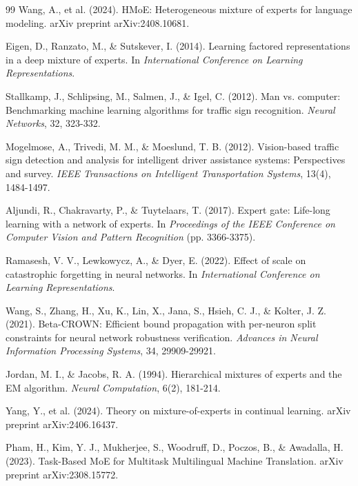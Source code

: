 \documentclass[11pt,a4paper]{article}
\begin{document}
\begin{thebibliography}{99}
Wang, A., et al. (2024). HMoE: Heterogeneous mixture of experts for language modeling. arXiv preprint arXiv:2408.10681.

Eigen, D., Ranzato, M., \& Sutskever, I. (2014). Learning factored representations in a deep mixture of experts. In \textit{International Conference on Learning Representations}.

Stallkamp, J., Schlipsing, M., Salmen, J., \& Igel, C. (2012). Man vs. computer: Benchmarking machine learning algorithms for traffic sign recognition. \textit{Neural Networks}, 32, 323-332.

Mogelmose, A., Trivedi, M. M., \& Moeslund, T. B. (2012). Vision-based traffic sign detection and analysis for intelligent driver assistance systems: Perspectives and survey. \textit{IEEE Transactions on Intelligent Transportation Systems}, 13(4), 1484-1497.

Aljundi, R., Chakravarty, P., \& Tuytelaars, T. (2017). Expert gate: Life-long learning with a network of experts. In \textit{Proceedings of the IEEE Conference on Computer Vision and Pattern Recognition} (pp. 3366-3375).

Ramasesh, V. V., Lewkowycz, A., \& Dyer, E. (2022). Effect of scale on catastrophic forgetting in neural networks. In \textit{International Conference on Learning Representations}.

Wang, S., Zhang, H., Xu, K., Lin, X., Jana, S., Hsieh, C. J., \& Kolter, J. Z. (2021). Beta-CROWN: Efficient bound propagation with per-neuron split constraints for neural network robustness verification. \textit{Advances in Neural Information Processing Systems}, 34, 29909-29921.

Jordan, M. I., \& Jacobs, R. A. (1994). Hierarchical mixtures of experts and the EM algorithm. \textit{Neural Computation}, 6(2), 181-214.

Yang, Y., et al. (2024). Theory on mixture-of-experts in continual learning. arXiv preprint arXiv:2406.16437.

Pham, H., Kim, Y. J., Mukherjee, S., Woodruff, D., Poczos, B., \& Awadalla, H. (2023). Task-Based MoE for Multitask Multilingual Machine Translation. arXiv preprint arXiv:2308.15772.

\end{thebibliography}

\appendix
\end{document}
